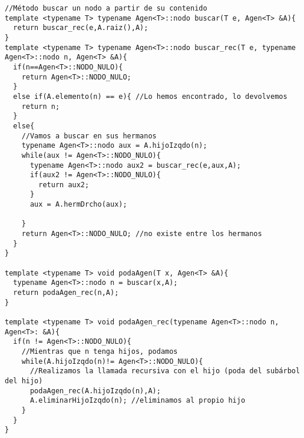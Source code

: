 \begin{verbatim}
//Método buscar un nodo a partir de su contenido
template <typename T> typename Agen<T>::nodo buscar(T e, Agen<T> &A){
  return buscar_rec(e,A.raiz(),A);
}
template <typename T> typename Agen<T>::nodo buscar_rec(T e, typename Agen<T>::nodo n, Agen<T> &A){
  if(n==Agen<T>::NODO_NULO){
    return Agen<T>::NODO_NULO;
  }
  else if(A.elemento(n) == e){ //Lo hemos encontrado, lo devolvemos
    return n;
  }
  else{
    //Vamos a buscar en sus hermanos
    typename Agen<T>::nodo aux = A.hijoIzqdo(n);
    while(aux != Agen<T>::NODO_NULO){
      typename Agen<T>::nodo aux2 = buscar_rec(e,aux,A);
      if(aux2 != Agen<T>::NODO_NULO){
        return aux2;
      }
      aux = A.hermDrcho(aux);

    }
    return Agen<T>::NODO_NULO; //no existe entre los hermanos
  }
}

template <typename T> void podaAgen(T x, Agen<T> &A){
  typename Agen<T>::nodo n = buscar(x,A);
  return podaAgen_rec(n,A);
}

template <typename T> void podaAgen_rec(typename Agen<T>::nodo n, Agen<T>: &A){
  if(n != Agen<T>::NODO_NULO){
    //Mientras que n tenga hijos, podamos
    while(A.hijoIzqdo(n)!= Agen<T>::NODO_NULO){
      //Realizamos la llamada recursiva con el hijo (poda del subárbol del hijo)
      podaAgen_rec(A.hijoIzqdo(n),A);
      A.eliminarHijoIzqdo(n); //eliminamos al propio hijo
    }
  }
}
\end{verbatim}
